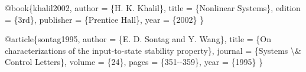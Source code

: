 \documentclass[
  11pt,
]{article}
\newenvironment{Shaded}{\begin{snugshade}}{\end{snugshade}}
\newcommand{\CharTok}[1]{\textcolor[rgb]{0.13,0.47,0.30}{#1}}
\newcommand{\DataTypeTok}[1]{\textcolor[rgb]{0.68,0.00,0.00}{#1}}
\newcommand{\NormalTok}[1]{\textcolor[rgb]{0.00,0.23,0.31}{#1}}
\newcommand{\OtherTok}[1]{\textcolor[rgb]{0.00,0.23,0.31}{#1}}
\newcommand{\VariableTok}[1]{\textcolor[rgb]{0.07,0.07,0.07}{#1}}
\theoremstyle{plain}
\theoremstyle{plain}
\theoremstyle{definition}
\theoremstyle{remark}
\begin{document}
\begin{tcolorbox}
\begin{Shaded}
\begin{Highlighting}[]
\VariableTok{@book}\NormalTok{\{}\OtherTok{khalil2002}\NormalTok{,}
  \DataTypeTok{author}\NormalTok{    = \{H. K. Khalil\},}
  \DataTypeTok{title}\NormalTok{     = \{Nonlinear Systems\},}
  \DataTypeTok{edition}\NormalTok{   = \{3rd\},}
  \DataTypeTok{publisher}\NormalTok{ = \{Prentice Hall\},}
  \DataTypeTok{year}\NormalTok{      = \{2002\}}
\NormalTok{\}}

\VariableTok{@article}\NormalTok{\{}\OtherTok{sontag1995}\NormalTok{,}
  \DataTypeTok{author}\NormalTok{  = \{E. D. Sontag and Y. Wang\},}
  \DataTypeTok{title}\NormalTok{   = \{On characterizations of the input{-}to{-}state stability property\},}
  \DataTypeTok{journal}\NormalTok{ = \{Systems }\CharTok{\textbackslash{}\&}\NormalTok{ Control Letters\},}
  \DataTypeTok{volume}\NormalTok{  = \{24\},}
  \DataTypeTok{pages}\NormalTok{   = \{351{-}{-}359\},}
  \DataTypeTok{year}\NormalTok{    = \{1995\}}
\NormalTok{\}}
\end{Highlighting}
\end{Shaded}

\end{tcolorbox}
\end{document}
